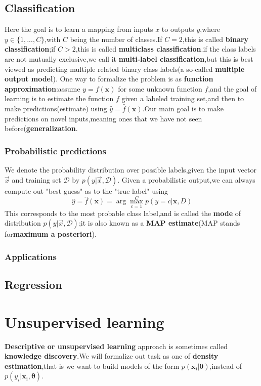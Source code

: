 \subsection{Classification}
  Here the goal is to learn a mapping from inputs $x$ to outputs $y$,where $y \in \{1,...,C\}$,with $C$ being the number of classes.If $C=2$,this is called \textbf{binary classification};if $C>2$,this is called \textbf{multiclass classification}.if the class labels are not mutually exclusive,we call it \textbf{multi-label classification},but this is best viewed as predicting multiple related binary class labels(a so-called \textbf{multiple output model}).
  One way to formalize the problem is as \textbf{function approximation}:assume $y=f(\mathbf{x})$ for some unknown function $f$,and the goal of learning is to estimate the function $f$ given a labeled training set,and then to make predictions(estimate) using $\hat{y} =\hat{f}(\mathbf{x})$.Our main goal is to make predictions on novel inputs,meaning ones that we have not seen before(\textbf{generalization}.
\subsubsection{Probabilistic predictions}
We denote the probability distribution over possible labels,given the input vector $\vec{x}$ and training set $\mathcal{D}$ by $p(y|\vec{x},\mathcal{D})$.
Given a probabilistic output,we can always compute out "best guess" as to the "true label" using
\begin{equation}
\hat{y} = \hat{f}(\mathbf{x}) = \arg\max\limits_{c=1}^{C} p(y=c|\mathbf{x},D)
\end{equation}
This corresponds to the most probable class label,and is called the \textbf{mode} of distribution $p(y|\vec{x},\mathcal{D})$;it is also known as a \textbf{MAP estimate}(MAP stands for\textbf{maximum a posteriori}).
\subsubsection{Applications}
\subsection{Regression}

\section{Unsupervised learning}
  \textbf{Descriptive or unsupervised learning} approach is sometimes called \textbf{knowledge discovery}.We will formalize out task as one of \textbf{density estimation},that is we want to build models of the form $p(\mathbf{x_i|\theta})$,instead of $p(y_i|\mathbf{x_i,\theta})$.
